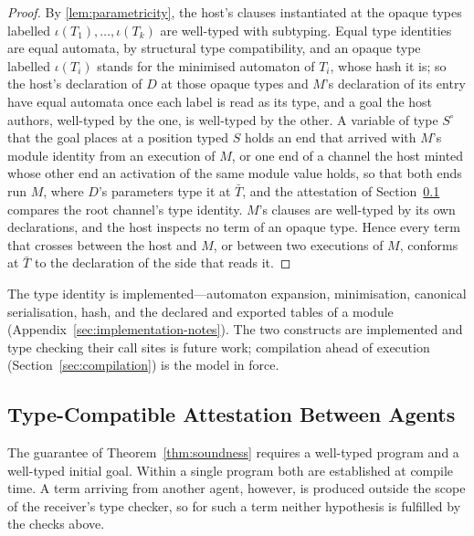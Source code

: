 \begin{proof}
By \cref{lem:parametricity}, the host's clauses instantiated at the opaque types labelled $\iota(T_1), \ldots, \iota(T_k)$ are well-typed with subtyping.  Equal type identities are equal automata, by structural type compatibility, and an opaque type labelled $\iota(T_i)$ stands for the minimised automaton of $T_i$, whose hash it is; so the host's declaration of $D$ at those opaque types and $M$'s declaration of its entry have equal automata once each label is read as its type, and a goal the host authors, well-typed by the one, is well-typed by the other.  A variable of type $S^\circ$ that the goal places at a position typed $S$ holds an end that arrived with $M$'s module identity from an execution of $M$, or one end of a channel the host minted whose other end an activation of the same module value holds, so that both ends run $M$, where $D$'s parameters type it at $\bar T$, and the attestation of Section~\ref{sec:runtime-boundary} compares the root channel's type identity.  $M$'s clauses are well-typed by its own declarations, and the host inspects no term of an opaque type.  Hence every term that crosses between the host and $M$, or between two executions of $M$, conforms at $\bar T$ to the declaration of the side that reads it.
\end{proof}

The type identity is implemented---automaton expansion, minimisation, canonical serialisation, hash, and the declared and exported tables of a module (Appendix~\ref{sec:implementation-notes}).  The two constructs are implemented and type checking their call sites is future work; compilation ahead of execution (Section~\ref{sec:compilation}) is the model in force.

\subsection{Type-Compatible Attestation Between Agents}
\label{sec:runtime-boundary}

The guarantee of Theorem~\ref{thm:soundness} requires a well-typed program and a well-typed initial goal.  Within a single program both are established at compile time.  A term arriving from another agent, however, is produced outside the scope of the receiver's type checker, so for such a term neither hypothesis is fulfilled by the checks above.

